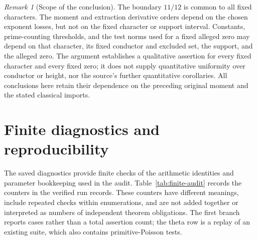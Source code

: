 \documentclass[11pt]{article}
\numberwithin{equation}{section}
\theoremstyle{definition}
\theoremstyle{remark}
\newtheorem{remark}[theorem]{Remark}
\begin{document}
\begin{remark}[Scope of the conclusion]
The boundary \(11/12\) is common to all fixed characters. The moment
and extraction derivative orders depend on the chosen exponent losses,
but not on the fixed character or support interval. Constants,
prime-counting thresholds, and the test norms used for a fixed alleged
zero may depend on that character, its fixed conductor and excluded
set, the support, and the alleged zero. The argument establishes a
qualitative assertion for every fixed character and every fixed zero;
it does not supply quantitative uniformity over conductor or height,
nor the source's further quantitative corollaries. All conclusions
here retain their dependence on the preceding original moment and the
stated classical imports.
\end{remark}


\section{Finite diagnostics and reproducibility}\label{sec:verification}


The saved diagnostics provide finite checks of the arithmetic identities
and parameter bookkeeping used in the audit. Table~\ref{tab:finite-audit}
records the counters in the verified run records. These counters have
different meanings, include repeated checks within enumerations, and
are not added together or interpreted as numbers of independent theorem
obligations. The first branch reports cases rather than a total assertion
count; the theta row is a replay of an existing suite, which also contains
primitive-Poisson tests.
\end{document}
